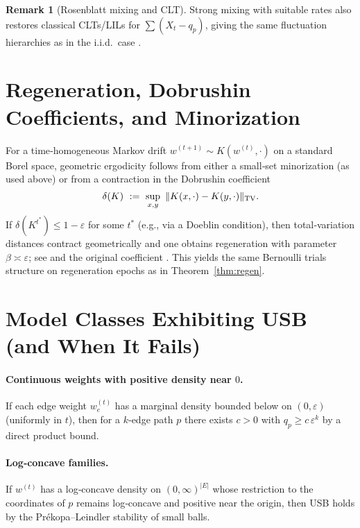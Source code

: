 \documentclass[11pt]{article}
\theoremstyle{plain}
\theoremstyle{definition}
\newtheorem{remark}{Remark}
\begin{document}
\begin{remark}[Rosenblatt mixing and CLT]
Strong mixing with suitable rates also restores classical CLTs/LILs for $\sum(X_t-q_p)$, giving the same fluctuation hierarchies as in the i.i.d.\ case \cite{Rosenblatt1956,Bradley2005}.
\end{remark}

\section{Regeneration, Dobrushin Coefficients, and Minorization}
For a time‑homogeneous Markov drift $w^{(t+1)}\sim K(w^{(t)},\cdot)$ on a standard Borel space, geometric ergodicity follows from either a small‑set minorization (as used above) or from a contraction in the Dobrushin coefficient
\[
\delta(K)\ :=\ \sup_{x,y}\ \|K(x,\cdot)-K(y,\cdot)\|_{\rm TV}.
\]
If $\delta(K^{t^\ast})\le 1-\varepsilon$ for some $t^\ast$ (e.g., via a Doeblin condition), then total‑variation distances contract geometrically and one obtains regeneration with parameter $\beta\asymp\varepsilon$; see \cite[§16]{MeynTweedie} and the original coefficient \cite{Dobrushin1956}. This yields the same Bernoulli trials structure on regeneration epochs as in Theorem~\ref{thm:regen}.

\section{Model Classes Exhibiting USB (and When It Fails)}
\paragraph{Continuous weights with positive density near $0$.}
If each edge weight $w_e^{(t)}$ has a marginal density bounded below on $(0,\varepsilon)$ (uniformly in $t$), then for a $k$‑edge path $p$ there exists $c>0$ with $q_p\ge c\,\varepsilon^k$ by a direct product bound.

\paragraph{Log‑concave families.}
If $w^{(t)}$ has a log‑concave density on $(0,\infty)^{|E|}$ whose restriction to the coordinates of $p$ remains log‑concave and positive near the origin, then USB holds by the Prékopa–Leindler stability of small balls.
\end{document}
